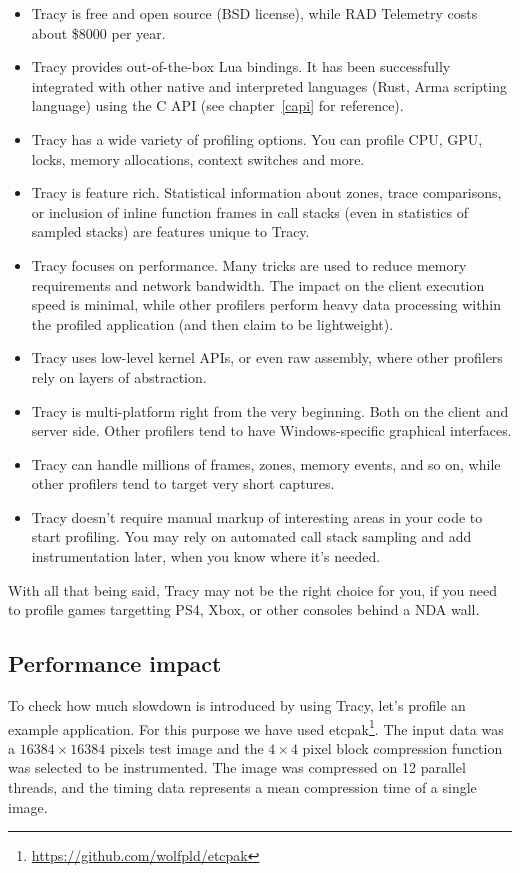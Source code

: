 \documentclass[hidelinks,titlepage,a4paper]{article}
\begin{document}
\begin{itemize}
\item Tracy is free and open source (BSD license), while RAD Telemetry costs about \$8000 per year.
\item Tracy provides out-of-the-box Lua bindings. It has been successfully integrated with other native and interpreted languages (Rust, Arma scripting language) using the C API (see chapter~\ref{capi} for reference).
\item Tracy has a wide variety of profiling options. You can profile CPU, GPU, locks, memory allocations, context switches and more.
\item Tracy is feature rich. Statistical information about zones, trace comparisons, or inclusion of inline function frames in call stacks (even in statistics of sampled stacks) are features unique to Tracy.
\item Tracy focuses on performance. Many tricks are used to reduce memory requirements and network bandwidth. The impact on the client execution speed is minimal, while other profilers perform heavy data processing within the profiled application (and then claim to be lightweight).
\item Tracy uses low-level kernel APIs, or even raw assembly, where other profilers rely on layers of abstraction.
\item Tracy is multi-platform right from the very beginning. Both on the client and server side. Other profilers tend to have Windows-specific graphical interfaces.
\item Tracy can handle millions of frames, zones, memory events, and so on, while other profilers tend to target very short captures.
\item Tracy doesn't require manual markup of interesting areas in your code to start profiling. You may rely on automated call stack sampling and add instrumentation later, when you know where it's needed.
\end{itemize}

With all that being said, Tracy may not be the right choice for you, if you need to profile games targetting PS4, Xbox, or other consoles behind a NDA wall.

\subsection{Performance impact}
\label{perfimpact}

To check how much slowdown is introduced by using Tracy, let's profile an example application. For this purpose we have used etcpak\footnote{\url{https://github.com/wolfpld/etcpak}}. The input data was a $16384 \times 16384$ pixels test image and the $4 \times 4$ pixel block compression function was selected to be instrumented. The image was compressed on 12 parallel threads, and the timing data represents a mean compression time of a single image.
\end{document}
